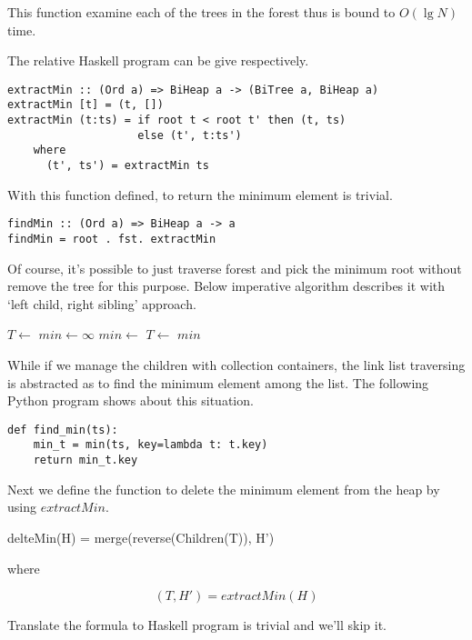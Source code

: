 \documentclass{article}
\begin{document}
This function examine each of the trees in the forest thus is bound
to $O(\lg N)$ time.

The relative Haskell program can be give respectively.

\lstset{language=Haskell}
\begin{lstlisting}
extractMin :: (Ord a) => BiHeap a -> (BiTree a, BiHeap a)
extractMin [t] = (t, [])
extractMin (t:ts) = if root t < root t' then (t, ts) 
                    else (t', t:ts')
    where
      (t', ts') = extractMin ts
\end{lstlisting}

With this function defined, to return the minimum element is trivial.

\begin{lstlisting}
findMin :: (Ord a) => BiHeap a -> a
findMin = root . fst. extractMin
\end{lstlisting}

Of course, it's possible to just traverse forest and pick the
minimum root without remove the tree for this purpose. Below
imperative algorithm describes it with `left child, right sibling' 
approach.

\begin{algorithmic}[1]
  \State $T \gets $ 
  \State $min \gets \infty$
      \State $min \gets $ 
    \EndIf
    \State $T \gets $ 
  \EndWhile
  \State \Return $min$
\EndFunction
\end{algorithmic}

While if we manage the children with collection containers, the link
list traversing is abstracted as to find the minimum element among the list.
The following Python program shows about this situation.

\lstset{language=Python}
\begin{lstlisting}
def find_min(ts):
    min_t = min(ts, key=lambda t: t.key)
    return min_t.key
\end{lstlisting}

Next we define the function to delete the minimum element from
the heap by using $extractMin$.

\be
delteMin(H) = merge(reverse(Children(T)), H')
\ee

where

\[
  (T, H') = extractMin(H)
\]

Translate the formula to Haskell program is trivial and we'll skip
it.
\end{document}
